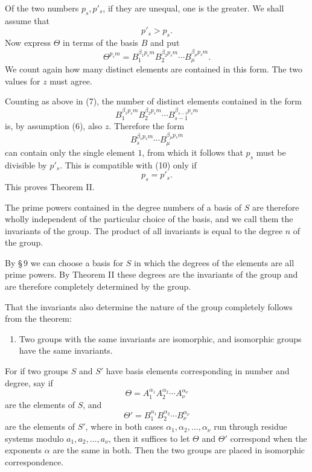 \documentclass[11pt]{article}
\begin{document}
Of the two numbers $p_s,p'_s$, if they are unequal, one is the greater. We shall assume that
\begin{equation}
p'_s>p_s.
\tag{10}
\end{equation}
Now express $\Theta$ in terms of the basis $B$ and put
\begin{equation}
\Theta^{p_sm}=B_1^{\beta_1p_sm}B_2^{\beta_2p_sm}\cdots B_\mu^{\beta_\mu p_sm}.
\tag{11}
\end{equation}
We count again how many distinct elements are contained in this form. The two values for $z$ must agree.

Counting as above in (7), the number of distinct elements contained in the form
\begin{equation}
B_1^{\beta_1p_sm}B_2^{\beta_2p_sm}\cdots B_{s-1}^{\beta_{s-1}p_sm}
\tag{12}
\end{equation}
is, by assumption (6), also $z$. Therefore the form
\begin{equation}
B_s^{\beta_sp_sm}\cdots B_\mu^{\beta_\mu p_sm}
\tag{13}
\end{equation}
can contain only the single element $1$, from which it follows that $p_s$ must be divisible by $p'_s$. This is compatible with (10) only if
\begin{equation}
p_s=p'_s.
\tag{14}
\end{equation}
This proves Theorem II.

The prime powers contained in the degree numbers of a basis of $S$ are therefore wholly independent of the particular choice of the basis, and we call them the invariants of the group. The product of all invariants is equal to the degree $n$ of the group.

By \S\,9 we can choose a basis for $S$ in which the degrees of the elements are all prime powers. By Theorem II these degrees are the invariants of the group and are therefore completely determined by the group.

That the invariants also determine the nature of the group completely follows from the theorem:

\begin{enumerate}[label=\Roman*.,start=3]
\item Two groups with the same invariants are isomorphic, and isomorphic groups have the same invariants.
\end{enumerate}

For if two groups $S$ and $S'$ have basis elements corresponding in number and degree, say if
\[
\Theta=A_1^{\alpha_1}A_2^{\alpha_2}\cdots A_\nu^{\alpha_\nu}
\]
are the elements of $S$, and
\[
\Theta'=B_1^{\alpha_1}B_2^{\alpha_2}\cdots B_\nu^{\alpha_\nu}
\]
are the elements of $S'$, where in both cases $\alpha_1,\alpha_2,
\ldots,
\alpha_\nu$ run through residue systems modulo $a_1,a_2,
\ldots,a_\nu$, then it suffices to let $\Theta$ and $\Theta'$ correspond when the exponents $\alpha$ are the same in both. Then the two groups are placed in isomorphic correspondence.
\end{document}
